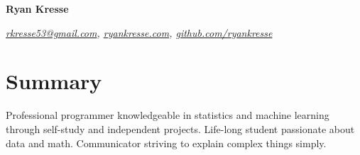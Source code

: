 \documentclass[10pt]{article}
\begin{document}
	\begin{flushleft}
		\textbf{{\Huge Ryan Kresse}}
	\end{flushleft}
	\emph{\href{mailto:rkresse53@gmail.com}{rkresse53@gmail.com}, \href{http://ryankresse.com}{ryankresse.com}, \href{https://github.com/ryankresse}{github.com/ryankresse}}
	
	\section{Summary}
		Professional programmer knowledgeable in statistics and machine learning through self-study and independent projects.
		Life-long student passionate about data and math. Communicator striving to explain complex things simply.  
	\begin{comment}
	\section{Contact and Links}
		\begin{itemize}[noitemsep]
			\item rkresse53@gmail.com
			\item ryankresse.com
			\item github.com/ryankresse
		\end{itemize}
	\end{comment}
	
\end{document}
